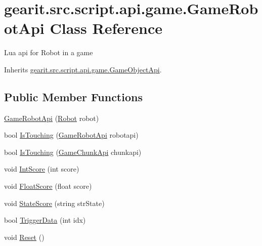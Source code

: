 \hypertarget{classgearit_1_1src_1_1script_1_1api_1_1game_1_1_game_robot_api}{\section{gearit.\+src.\+script.\+api.\+game.\+Game\+Robot\+Api Class Reference}
\label{classgearit_1_1src_1_1script_1_1api_1_1game_1_1_game_robot_api}
}


Lua api for Robot in a game  




Inherits \hyperlink{classgearit_1_1src_1_1script_1_1api_1_1game_1_1_game_object_api}{gearit.\+src.\+script.\+api.\+game.\+Game\+Object\+Api}.

\subsection*{Public Member Functions}
\begin{DoxyCompactItemize}
\item 
\hyperlink{classgearit_1_1src_1_1script_1_1api_1_1game_1_1_game_robot_api_ad4c6da66227671b132a2790ab0c8914f}{Game\+Robot\+Api} (\hyperlink{classgearit_1_1src_1_1robot_1_1_robot}{Robot} robot)
\item 
bool \hyperlink{classgearit_1_1src_1_1script_1_1api_1_1game_1_1_game_robot_api_a85463989e09c84731f08e46d75fff5cf}{Is\+Touching} (\hyperlink{classgearit_1_1src_1_1script_1_1api_1_1game_1_1_game_robot_api}{Game\+Robot\+Api} robotapi)
\item 
bool \hyperlink{classgearit_1_1src_1_1script_1_1api_1_1game_1_1_game_robot_api_aee841f5dca6757d0082123594282d855}{Is\+Touching} (\hyperlink{classgearit_1_1src_1_1script_1_1api_1_1game_1_1_game_chunk_api}{Game\+Chunk\+Api} chunkapi)
\item 
void \hyperlink{classgearit_1_1src_1_1script_1_1api_1_1game_1_1_game_robot_api_a8b35868df0684f9a94857aa64d98910e}{Int\+Score} (int score)
\item 
void \hyperlink{classgearit_1_1src_1_1script_1_1api_1_1game_1_1_game_robot_api_a1ce65eb1905abcc979b171b2add13841}{Float\+Score} (float score)
\item 
void \hyperlink{classgearit_1_1src_1_1script_1_1api_1_1game_1_1_game_robot_api_a92ba643ccf905ea4ca4addbf666a7d59}{State\+Score} (string str\+State)
\item 
bool \hyperlink{classgearit_1_1src_1_1script_1_1api_1_1game_1_1_game_robot_api_ab43d61fd18d020babacef35f0ce3f303}{Trigger\+Data} (int idx)
\item 
void \hyperlink{classgearit_1_1src_1_1script_1_1api_1_1game_1_1_game_robot_api_a17e00313f4dedcf8f5eb9b5412fc8d81}{Reset} ()
\end{DoxyCompactItemize}
